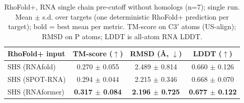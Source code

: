 \begin{table}[htbp]
\centering
\caption{RhoFold+, RNA single chain pre-cutoff without homologs (n=7); single run. Mean $\pm$ s.d. over targets (one deterministic RhoFold+ prediction per target); bold = best mean per metric. TM-score on C3$'$ atoms (US-align); RMSD on P atoms; LDDT is all-atom RNA LDDT.}
\label{tab:rf_rna_single_chain_pre_cutoff_without_homologs}
\begin{tabular}{lccc}
\toprule
RhoFold+ input & TM-score ($\uparrow$) & RMSD (\AA, $\downarrow$) & LDDT ($\uparrow$) \\
\midrule
SHS (RNAfold) & 0.270 $\pm$ 0.055 & 2.489 $\pm$ 0.814 & 0.660 $\pm$ 0.126 \\
SHS (SPOT-RNA) & 0.294 $\pm$ 0.044 & 2.215 $\pm$ 0.346 & 0.668 $\pm$ 0.070 \\
SHS (RNAformer) & \textbf{0.317 $\pm$ 0.084} & \textbf{2.196 $\pm$ 0.725} & \textbf{0.677 $\pm$ 0.122} \\
\bottomrule
\end{tabular}
\end{table}
